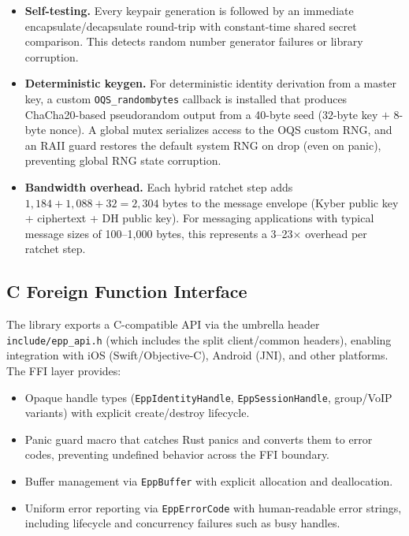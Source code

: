 \documentclass[11pt,a4paper]{article}
\theoremstyle{definition}
\begin{document}
\begin{itemize}
  \item \textbf{Self-testing.} Every keypair generation is followed by an immediate encapsulate/decapsulate round-trip with constant-time shared secret comparison. This detects random number generator failures or library corruption.

  \item \textbf{Deterministic keygen.} For deterministic identity derivation from a master key, a custom \texttt{OQS\_randombytes} callback is installed that produces ChaCha20-based pseudorandom output from a 40-byte seed ($32$-byte key $+$ $8$-byte nonce). A global mutex serializes access to the OQS custom RNG, and an RAII guard restores the default system RNG on drop (even on panic), preventing global RNG state corruption.

  \item \textbf{Bandwidth overhead.} Each hybrid ratchet step adds $1{,}184 + 1{,}088 + 32 = 2{,}304$ bytes to the message envelope (Kyber public key + ciphertext + DH public key). For messaging applications with typical message sizes of 100--1{,}000 bytes, this represents a 3--23$\times$ overhead per ratchet step.
\end{itemize}

\subsection{C Foreign Function Interface}

The library exports a C-compatible API via the umbrella header \texttt{include/epp\_api.h} (which includes the split client/common headers), enabling integration with iOS (Swift/Objective-C), Android (JNI), and other platforms. The FFI layer provides:

\begin{itemize}
  \item Opaque handle types (\texttt{EppIdentityHandle}, \texttt{EppSessionHandle}, group/VoIP variants) with explicit create/destroy lifecycle.
  \item Panic guard macro that catches Rust panics and converts them to error codes, preventing undefined behavior across the FFI boundary.
  \item Buffer management via \texttt{EppBuffer} with explicit allocation and deallocation.
  \item Uniform error reporting via \texttt{EppErrorCode} with human-readable error strings, including lifecycle and concurrency failures such as busy handles.
\end{itemize}
\end{document}
